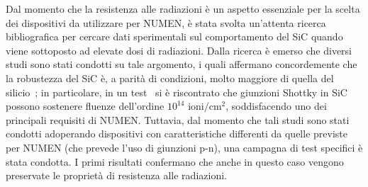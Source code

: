 
Dal momento che la resistenza alle radiazioni è un aspetto essenziale per la scelta dei dispositivi da utilizzare per NUMEN, è stata svolta un'attenta ricerca bibliografica per cercare dati sperimentali sul comportamento del SiC quando viene sottoposto ad elevate dosi di radiazioni.
Dalla ricerca è emerso che diversi studi sono stati condotti su tale argomento, i quali affermano concordemente che la robustezza del SiC è, a parità di condizioni, molto maggiore di quella del silicio~\cite{garcialopez:nimb16, nava:nima03}; in particolare, in un test~\cite{raciti:npa10} si è riscontrato che giunzioni Shottky in SiC possono sostenere fluenze dell'ordine $10^{14}$  $\mbox{ioni}/\mbox{cm}^2$, soddisfacendo uno dei principali requisiti di NUMEN.
Tuttavia, dal momento che tali studi sono stati condotti adoperando dispositivi con caratteristiche differenti da quelle previste per NUMEN (che prevede l'uso di giunzioni p-n), una campagna di test specifici è stata condotta.
I primi risultati confermano che anche in questo caso vengono preservate le proprietà di resistenza alle radiazioni. 

